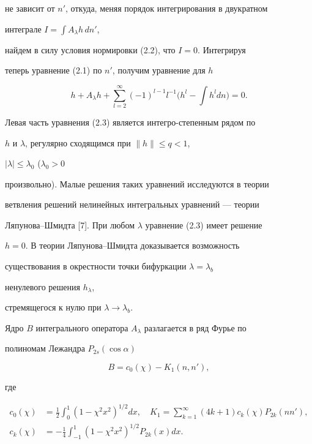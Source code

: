 не зависит от $n'$, откуда, меняя порядок интегрирования в двукратном  


интеграле $I=\int A_\lambda h\,dn'$, 


найдем в силу условия нормировки (2.2), что $I=0$. Интегрируя 


теперь уравнение (2.1) по $n'$, получим уравнение для $h$ 


\begin{equation} 


h+A_\lambda h+\sum^\infty_{l=2}(-1)^{l-1}l^{-1} 


\Big(h^l-\int h^l dn\Big)=0.\tag{2.3} 


\end{equation} 


Левая часть уравнения (2.3) является интегро-степенным рядом по 


$h$ и $\lambda$, регулярно сходящимся при $\|h\|\le q<1$, 


$|\lambda|\le\lambda_0$ ($\lambda_0>0$


произвольно). Малые решения таких уравнений исследуются в теории 


ветвления решений нелинейных интегральных уравнений --- теории  


Ляпунова--Шмидта [7]. При любом $\lambda$ уравнение (2.3) имеет решение  


$h=0$. В теории Ляпунова--Шмидта доказывается возможность 


существования в окрестности точки бифуркации $\lambda=\lambda_b$ 


ненулевого решения $h_\lambda$, 


стремящегося к нулю при $\lambda\to\lambda_b$. 


 


Ядро $B$ интегрального оператора $A_\lambda$ разлагается в ряд Фурье по  


полиномам Лежандра $P_{2s}(\cos\alpha)$ 


$$ 


B=c_0(\chi)-K_1(n,n'), 


$$ 


где 


\begin{equation} 


\begin{split} 


c_0(\chi)&=\frac{1}{2}\int^1_0(1-\chi^2x^2)^{1/2}dx,\quad 


K_1=\sum^\infty_{k=1}(4k+1)c_k(\chi)P_{2k}(nn'), \\ 


c_k(\chi)&=-\frac{1}{4}\int^1_{-1}(1-\chi^2x^2)^{1/2} 


P_{2k}(x)dx. 


\end{split} 


\tag{2.4} 


\end{equation} 


